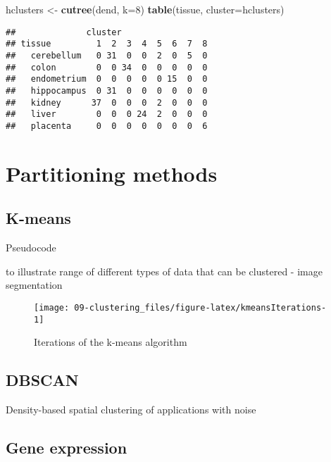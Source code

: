 \documentclass[]{book}
\newenvironment{Shaded}{\begin{snugshade}}{\end{snugshade}}
\newcommand{\KeywordTok}[1]{\textcolor[rgb]{0.13,0.29,0.53}{\textbf{{#1}}}}
\newcommand{\DataTypeTok}[1]{\textcolor[rgb]{0.13,0.29,0.53}{{#1}}}
\newcommand{\DecValTok}[1]{\textcolor[rgb]{0.00,0.00,0.81}{{#1}}}
\newcommand{\StringTok}[1]{\textcolor[rgb]{0.31,0.60,0.02}{{#1}}}
\newcommand{\NormalTok}[1]{{#1}}
\theoremstyle{definition}
\theoremstyle{definition}
\theoremstyle{definition}
\theoremstyle{remark}
\begin{document}
\begin{Shaded}
\begin{Highlighting}[]
\NormalTok{hclusters <-}\StringTok{ }\KeywordTok{cutree}\NormalTok{(dend, }\DataTypeTok{k=}\DecValTok{8}\NormalTok{)}
\KeywordTok{table}\NormalTok{(tissue, }\DataTypeTok{cluster=}\NormalTok{hclusters)}
\end{Highlighting}
\end{Shaded}

\begin{verbatim}
##              cluster
## tissue         1  2  3  4  5  6  7  8
##   cerebellum   0 31  0  0  2  0  5  0
##   colon        0  0 34  0  0  0  0  0
##   endometrium  0  0  0  0  0 15  0  0
##   hippocampus  0 31  0  0  0  0  0  0
##   kidney      37  0  0  0  2  0  0  0
##   liver        0  0  0 24  2  0  0  0
##   placenta     0  0  0  0  0  0  0  6
\end{verbatim}

\section{Partitioning methods}\label{partitioning-methods}

\subsection{K-means}\label{k-means}

Pseudocode

to illustrate range of different types of data that can be clustered -
image segmentation

\begin{figure}

{\centering \texttt{[image: 09-clustering\_files/figure-latex/kmeansIterations-1]} 

}

\caption{Iterations of the k-means algorithm}\label{fig:kmeansIterations}
\end{figure}

\subsection{DBSCAN}\label{dbscan}

Density-based spatial clustering of applications with noise

\subsection{Gene expression}\label{gene-expression}
\end{document}
